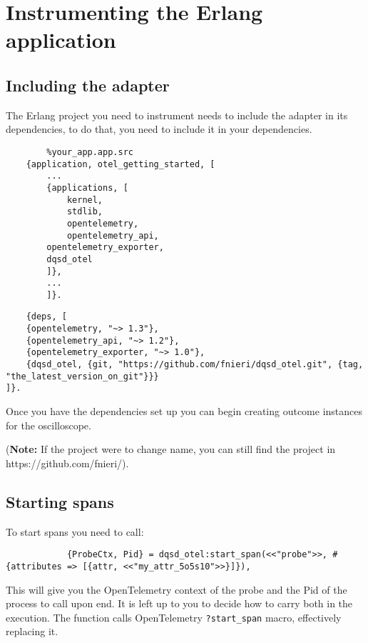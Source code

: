 \section{Instrumenting the Erlang application} \label{app:instr_app}
    \subsection{Including the adapter}

    The Erlang project you need to instrument needs to include the adapter in its dependencies, to do that, you need to include it in your dependencies.

    \begin{verbatim}
        %your_app.app.src
    {application, otel_getting_started, [
        ...
        {applications, [
            kernel,
            stdlib,
            opentelemetry,
            opentelemetry_api,
        opentelemetry_exporter,
        dqsd_otel
        ]},
        ...
        ]}.
    \end{verbatim}

    \begin{verbatim}
    {deps, [
    {opentelemetry, "~> 1.3"},
    {opentelemetry_api, "~> 1.2"},
    {opentelemetry_exporter, "~> 1.0"},
    {dqsd_otel, {git, "https://github.com/fnieri/dqsd_otel.git", {tag, "the_latest_version_on_git"}}}
]}.
    \end{verbatim}
    
    Once you have the dependencies set up you can begin creating outcome instances for the oscilloscope.

    (\textbf{Note:} If the project were to change name, you can still find the project in https://github.com/fnieri/).

    \subsection{Starting spans}
        To start spans you need to call:
        \begin{verbatim}
            {ProbeCtx, Pid} = dqsd_otel:start_span(<<"probe">>, #{attributes => [{attr, <<"my_attr_5o5s10">>}]}),
        \end{verbatim}
        This will give you the OpenTelemetry context of the probe and the Pid of the process to call upon end. It is left up to you to decide how to carry both in the execution.
        The function calls OpenTelemetry \texttt{?start\_span} macro, effectively replacing it.

